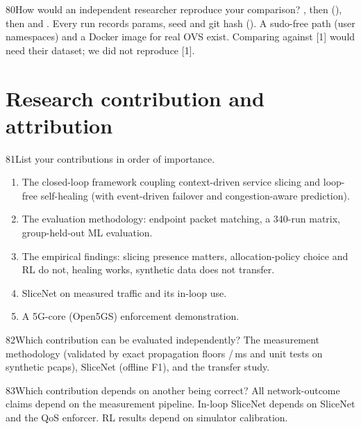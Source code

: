 \begin{qa}{80}{How would an independent researcher reproduce your comparison?}
, then  (), then
 and . Every run records params, seed and git hash ().
A sudo-free path (user namespaces) and a Docker image for real OVS exist. Comparing against [1] would need their
dataset; we did not reproduce [1].
\end{qa}

\section{Research contribution and attribution}

\begin{qa}{81}{List your contributions in order of importance.}
\begin{enumerate}[leftmargin=1.3em]
\item The closed-loop framework coupling context-driven service slicing and loop-free self-healing (with event-driven
failover and congestion-aware prediction).
\item The evaluation methodology: endpoint packet matching, a 340-run matrix, group-held-out ML evaluation.
\item The empirical findings: slicing presence matters, allocation-policy choice and RL do not, healing works,
synthetic data does not transfer.
\item SliceNet on measured traffic and its in-loop use.
\item A 5G-core (Open5GS) enforcement demonstration.
\end{enumerate}
\end{qa}

\begin{qa}{82}{Which contribution can be evaluated independently?}
The measurement methodology (validated by exact propagation floors \NFloorEdge/\NFloorCore\,ms and unit tests on
synthetic pcaps), SliceNet (offline F1), and the transfer study.
\end{qa}

\begin{qa}{83}{Which contribution depends on another being correct?}
All network-outcome claims depend on the measurement pipeline. In-loop SliceNet depends on SliceNet and the QoS
enforcer. RL results depend on simulator calibration.
\end{qa}

